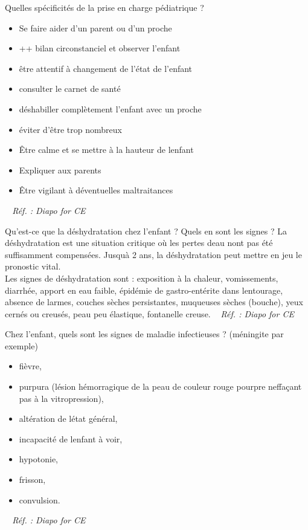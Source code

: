 \documentclass[grid,avery5371,landscape]{flashcards}
\makeatletter
\newcounter{nocarte}
\newcommand{\categ}[1]{%
  \def\@categ{#1}%
  \setcounter{nocarte}{0}%
}
\newcommand{\source}[1]{%
  \medskip
  \itshape%
   ~ \hfill Réf. : #1}
\makeatother
\begin{document}
\color[HTML]{01DF01}
\categ{CE-CP-REG}
\begin{flashcard}[CAT]{
 Quelles spécificités de la prise en charge pédiatrique ?   }
  \begin{itemize}
        \item Se faire aider d'un parent ou d'un proche 
        \item ++ bilan circonstanciel et observer l'enfant
        \item être attentif à changement de l'état de l'enfant
        \item consulter le carnet de santé
        \item déshabiller complètement l'enfant avec un proche
        \item éviter d'être trop nombreux
        \item Être calme et se mettre à la hauteur de lenfant
        \item Expliquer aux parents
        \item Être vigilant à déventuelles maltraitances
    \end{itemize}
  \source{Diapo for CE }
\end{flashcard}


\color[HTML]{01DF01}
\categ{CE-CP-REG}
\begin{flashcard}[bilan]{
 Qu'est-ce que la déshydratation chez l'enfant ? Quels en sont les signes ?   }
  La déshydratation est une situation critique où les pertes deau nont pas été suffisamment compensées. Jusquà 2 ans, la déshydratation peut mettre en jeu le pronostic vital. \\
   Les signes de déshydratation sont : exposition à la chaleur, vomissements, diarrhée, apport en eau faible, épidémie de gastro-entérite dans lentourage, absence de larmes, couches sèches persistantes, muqueuses sèches (bouche), yeux cernés ou creusés, peau peu élastique, fontanelle creuse.
  \source{Diapo for CE }
\end{flashcard}


\color[HTML]{01DF01}
\categ{CE-CP-REG}
\begin{flashcard}[bilan]{
 Chez l'enfant, quels sont les signes de maladie infectieuses ? (méningite par exemple)   }
  \begin{itemize}
       \item fièvre, 
       \item purpura (lésion hémorragique de la peau de couleur rouge pourpre neffaçant pas à la vitropression), 
       \item altération de létat général, 
       \item incapacité de lenfant à voir, 
       \item hypotonie, 
       \item frisson, 
       \item convulsion.
   \end{itemize}
  \source{Diapo for CE }
\end{flashcard}
\end{document}
